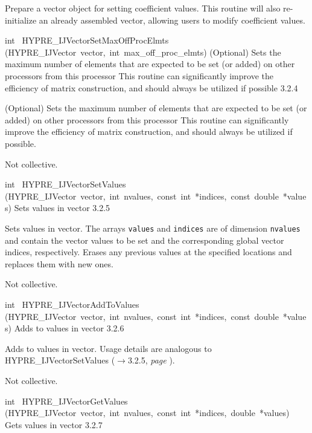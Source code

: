 \documentclass{article}
\begin{document}
\begin{cxxentry}
\begin{cxxentry}
\begin{cxxfunction}
\begin{cxxdoc}
Prepare a vector object for setting coefficient values.  This
routine will also re-initialize an already assembled vector,
allowing users to modify coefficient values.
\end{cxxdoc}
\end{cxxfunction}
\begin{cxxfunction}
{int\ }
        {HYPRE\_IJVectorSetMaxOffProcElmts}
        {(HYPRE\_IJVector\ vector,\ int\ max\_off\_proc\_elmts)}
        {
(Optional) Sets the maximum number of elements that are expected to be set
(or added) on other processors from this processor
This routine can significantly improve the efficiency of matrix
construction, and should always be utilized if possible}
        {3.2.4}
\begin{cxxdoc}

(Optional) Sets the maximum number of elements that are expected to be set
(or added) on other processors from this processor
This routine can significantly improve the efficiency of matrix
construction, and should always be utilized if possible.

Not collective.
\end{cxxdoc}
\end{cxxfunction}
\begin{cxxfunction}
{int\ }
        {HYPRE\_IJVectorSetValues}
        {(HYPRE\_IJVector\ vector,\ int\ nvalues,\ const\ int\ *indices,\ const\ double\ *values)}
        {
Sets values in vector}
        {3.2.5}
\begin{cxxdoc}

Sets values in vector.  The arrays {\tt values} and {\tt indices}
are of dimension {\tt nvalues} and contain the vector values to be
set and the corresponding global vector indices, respectively.
Erases any previous values at the specified locations and replaces
them with new ones.

Not collective.
\end{cxxdoc}
\end{cxxfunction}
\begin{cxxfunction}
{int\ }
        {HYPRE\_IJVectorAddToValues}
        {(HYPRE\_IJVector\ vector,\ int\ nvalues,\ const\ int\ *indices,\ const\ double\ *values)}
        {
Adds to values in vector}
        {3.2.6}
\begin{cxxdoc}

Adds to values in vector.  Usage details are analogous to
HYPRE\_IJVectorSetValues ($\rightarrow$3.2.5, {\em page \pageref{cxx.3.2.5}}).

Not collective.
\end{cxxdoc}
\end{cxxfunction}
\begin{cxxfunction}
{int\ }
        {HYPRE\_IJVectorGetValues}
        {(HYPRE\_IJVector\ vector,\ int\ nvalues,\ const\ int\ *indices,\ double\ *values)}
        {
Gets values in vector}
        {3.2.7}
\begin{cxxdoc}


\end{cxxdoc}
\end{cxxfunction}
\end{cxxentry}
\end{cxxentry}
\end{document}
